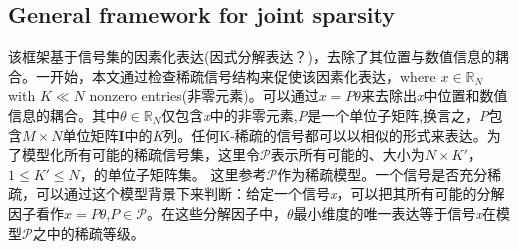 \documentclass[UTF8]{ctexart}
\theoremstyle{plain}
\theoremstyle{definition}
\theoremstyle{remark}
\begin{document}
	\subsection{General framework for joint sparsity}
	\label{sec3.2}
	该框架基于信号集的因素化表达(\textcolor[rgb]{0,0,1}{因式分解表达？})，去除了其位置与数值信息的耦合。一开始，本文通过检查稀疏信号结构来促使该因素化表达，where $x \in \mathbb{R}_N$ with $K\ll N$ nonzero entries(非零元素)。可以通过$x = P\theta$来去除出\emph{x}中位置和数值信息的耦合。其中$\theta \in \mathbb{R}_N$仅包含\emph{x}中的非零元素,\emph{P}是一个单位子矩阵,换言之，\emph{P}包含$M \times N$单位矩阵\textbf{I}中的\emph{K}列。任何K-稀疏的信号都可以以相似的形式来表达。为了模型化所有可能的稀疏信号集，这里令$\mathcal{P}$表示所有可能的、大小为$N \times K'$，$1\leq K'\leq N$，的单位子矩阵集。 这里参考$\mathcal{P}$作为稀疏模型。一个信号是否充分稀疏，可以通过这个模型背景下来判断：给定一个信号\emph{x}，可以把其所有可能的分解因子看作$x=P\theta$,$P \in \mathcal{P}$。在这些分解因子中，$\theta$最小维度的唯一表达等于信号\emph{x}在模型$\mathcal{P}$之中的\textcolor[rgb]{1,0,0}{稀疏等级}。
	
\end{document}
